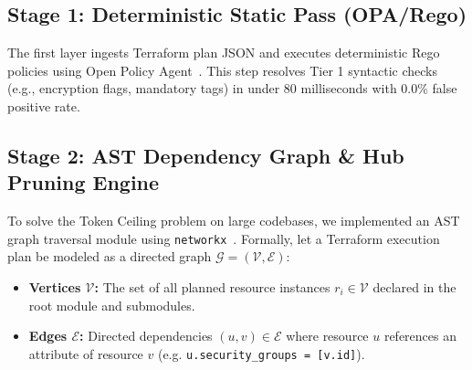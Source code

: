 \documentclass[conference]{IEEEtran}
\begin{document}
\subsection{Stage 1: Deterministic Static Pass (OPA/Rego)}
The first layer ingests Terraform plan JSON and executes deterministic Rego policies using Open Policy Agent~\cite{opa_rego}. This step resolves Tier 1 syntactic checks (e.g., encryption flags, mandatory tags) in under 80 milliseconds with 0.0\% false positive rate.

\subsection{Stage 2: AST Dependency Graph \& Hub Pruning Engine}
To solve the Token Ceiling problem on large codebases, we implemented an AST graph traversal module using \texttt{networkx}~\cite{networkx}. Formally, let a Terraform execution plan be modeled as a directed graph $\mathcal{G} = (\mathcal{V}, \mathcal{E})$:
\begin{itemize}
    \item \textbf{Vertices $\mathcal{V}$:} The set of all planned resource instances $r_i \in \mathcal{V}$ declared in the root module and submodules.
    \item \textbf{Edges $\mathcal{E}$:} Directed dependencies $(u, v) \in \mathcal{E}$ where resource $u$ references an attribute of resource $v$ (e.g. \texttt{u.security\_groups = [v.id]}).
\end{itemize}
\end{document}
